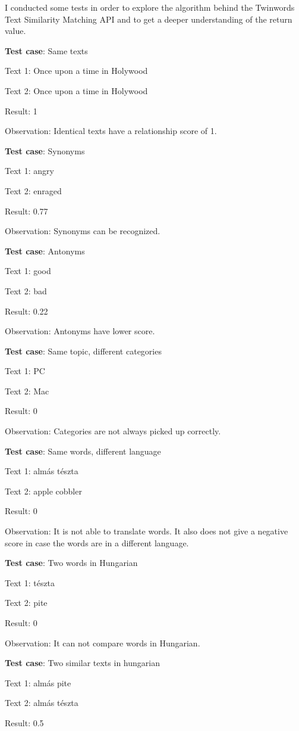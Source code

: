I conducted some tests in order to explore the algorithm behind the Twinwords Text Similarity Matching API and to get a deeper understanding of the return value.

\textbf{Test case}: Same texts

Text 1: Once upon a time in Holywood

Text 2: Once upon a time in Holywood

Result: 1

Observation: Identical texts have a relationship score of 1.

\textbf{Test case}: Synonyms

Text 1: angry

Text 2: enraged

Result: 0.77

Observation: Synonyms can be recognized.

\textbf{Test case}: Antonyms

Text 1: good

Text 2: bad

Result: 0.22

Observation: Antonyms have lower score.

\textbf{Test case}: Same topic, different categories

Text 1: PC

Text 2: Mac

Result: 0

Observation: Categories are not always picked up correctly.

\textbf{Test case}: Same words, different language

Text 1: almás tészta

Text 2: apple cobbler

Result: 0

Observation: It is not able to translate words. It also does not give a negative score in case the words are in a different language.

\textbf{Test case}: Two words in Hungarian

Text 1: tészta

Text 2: pite

Result: 0

Observation: It can not compare words in Hungarian.

\textbf{Test case}: Two similar texts in hungarian

Text 1: almás pite

Text 2: almás tészta

Result: 0.5

